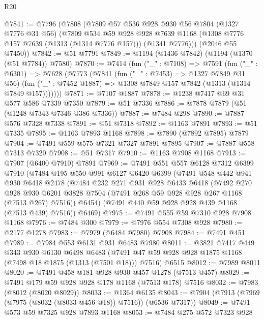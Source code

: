 \begin{lexlean}{R20}
\begin{coremodule}
@7841 := @7796
    (@7808
      (@7809
        @57
        @536
        @928
        @930
        @56
        @7804
        (@1327 @7776 @31 @56)
        (@7809
          @534
          @59
          @928
          @928
          @7639
          @1168
          (@1308 @7776 @157 @7639 (@1313 (@1314 @7776 @157)))
          (@1341 @7776)))
      (@2046 @55 @7450))
@7842 := @51 @7791
@7849 := @1194 (@1436 @7842) (@1194 (@1370 (@51 @7784)) @7580)
@7870 := @7414
    (fun ("_" : @7108) =>
    @7591
      (fun ("_" : @6301) =>
      @7628
        (@7773
          (@7841
            (fun ("_" : @7453) => @1327 @7849 @31 @56)
            (fun ("_" : @7452 @1887) => @1308 @7849 @157 @7842 (@1313 (@1314 @7849 @157)))))))
@7871 := @7107 @1887
@7878 := @1238 @7417 @69 @31 @577 @586 @7339 @7350
@7879 := @51 @7336
@7886 := @7878 @7879 (@51 (@1248 @7343 @7346 @386 @7336))
@7887 := @7484 @298
@7890 := @7887 @576 @7328 @7338
@7891 := @51 @7318
@7892 := @1163 @7891
@7893 := @51 @7335
@7895 := @1163 @7893 @1168
@7898 := @7890 (@7892 @7895) @7879
@7904 := @7491 @559 @575 @7321 @7327 @7891 @7895
@7907 := @7887 @558 @7313 @7320
@7908 := @51 @7317
@7910 := @1163 @7908 @1168
@7913 := @7907 (@6400 @7910) @7891
@7969 := @7491
    @551
    @557
    @6128
    @7312
    @6399
    @7910
    (@7484
      @195
      @550
      @991
      @6127
      @6420
      @6399
      (@7491
        @548
        @442
        @941
        @930
        @6418
        @2478
        (@7484
          @232
          @271
          @931
          @928
          @6433
          @6418
          (@7492
            @270
            @928
            @930
            @6201
            @3828
            @7504
            (@7491 @268 @59 @928 @928 @267 @1168 (@7513 @267) @7516))
          @6454)
        (@7491 @440 @59 @928 @928 @439 @1168 (@7513 @439) @7516))
      @6469)
@7975 := @7491 @555 @59 @7310 @928 @7908 @1168
@7976 := @7484 @300
@7979 := @7976 @554 @7308 @928
@7980 := @2177 @1278
@7983 := @7979 (@6484 @7980) @7908
@7984 := @7491 @451
@7989 := @7984 @553 @6131 @931 @6483 @7980
@8011 := @3821
    @7417
    @449
    @343
    @930
    @6130
    @6498
    @6483
    (@7491 @47 @59 @928 @928 @1875 @1168 (@7498 @18 @1875 (@1313 (@7501 @18))) @7516)
    @6515
@8012 := @7989 @8011
@8020 := @7491 @458 @181 @928 @930 @457 @1278 (@7513 @457)
@8029 := @7491 @179 @59 @928 @928 @178 @1168 (@7513 @178) @7516
@8032 := @7983 (@8012 (@8020 @8029))
@8033 := @1364 @6135
@8043 := @7904 (@7913 (@7969 (@7975 (@8032 (@8033 @456 @18)) @7516)) (@6536 @7317))
@8049 := @7491 @573 @59 @7325 @928 @7893 @1168
@8053 := @7484 @275 @572 @7323 @928

\end{coremodule}
\end{lexlean}
